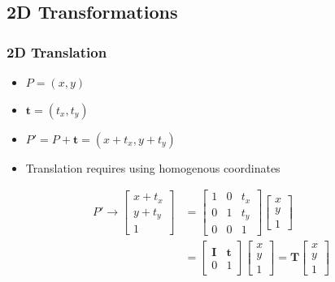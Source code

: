 \documentclass[letterpaper,12pt]{article}
\newcommand{\lra}{\ensuremath{\longrightarrow{}}}
\newcommand{\vect}[1]{\mathbf{#1}}
\newcommand{\matr}[1]{\mathbf{#1}}
\begin{document}
\subsection{2D Transformations}
\subsubsection{2D Translation}
\begin{itemize}
 \item $P = (x,y)$
 \item $\vect{t} = (t_x,t_y)$
 \item $P' = P + \vect{t} = (x + t_x, y + t_y)$
 \item Translation requires using homogenous coordinates
\end{itemize}
\begin{align}
 P' \lra \begin{bmatrix}
  x + t_x \\
  y + t_y \\
  1
 \end{bmatrix}
  & = \begin{bmatrix}
  1 & 0 & t_x \\
  0 & 1 & t_y \\
  0 & 0 & 1
 \end{bmatrix}
 \begin{bmatrix}
  x \\
  y \\
  1
 \end{bmatrix}      \\
  & = \begin{bmatrix}
  \matr{I} & \vect{t} \\
  0        & 1
 \end{bmatrix}
 \begin{bmatrix}
  x \\
  y \\
  1
 \end{bmatrix}
 = \matr{T} \begin{bmatrix}
  x \\
  y \\
  1
 \end{bmatrix}
\end{align}
\end{document}
